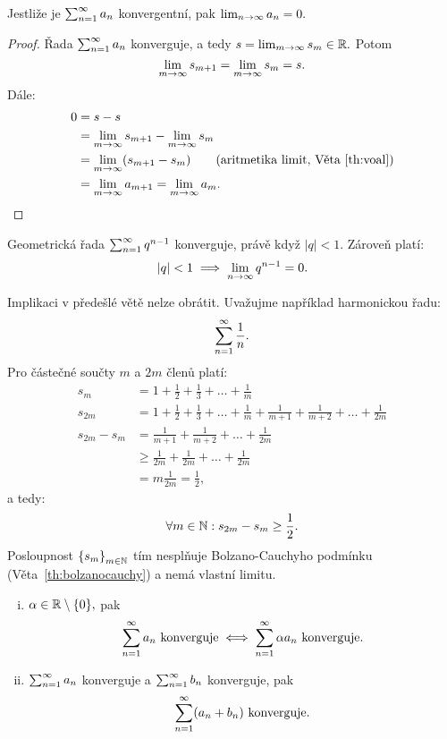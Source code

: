 \begin{theorem}
    \label{th:radykonvergencenutna}
    Jestliže je $\sum_{n=1}^\infty a_n$ konvergentní, pak $\lim_{n \to \infty} a_n = 0.$
\end{theorem}

\begin{proof}
    Řada $\sum_{n=1}^\infty a_n$ konverguje, a tedy $s = \lim_{m\to\infty} s_m \in \mathbb{R}.$ Potom
    $$\lim_{m \to \infty} s_{m+1} = \lim_{m \to \infty} s_m = s.$$
    Dále:
    \begin{align*}
        0 
        &= s-s \\
        &= \limminf s_{m+1} - \limminf s_m \\
        &= \limminf (s_{m+1} - s_m) \tag{aritmetika limit, Věta~\ref{th:voal}}  \\
        &= \limminf a_{m+1} = \limminf a_m.
    \end{align*}
\end{proof}

\begin{example}
    Geometrická řada $\sum_{n=1}^\infty q^{n-1}$ konverguje, právě když $|q| < 1.$ Zároveň
    platí:
    $$|q| < 1 \implies \lim_{n \to \infty} q^{n-1} = 0.$$
\end{example}

\begin{remark}
    \label{rm:konvergence_harmonicke_rady}
    Implikaci v předešlé větě nelze obrátit. Uvažujme například harmonickou
    řadu: 
    $$\sum_{n=1}^\infty \frac{1}{n}.$$
    Pro částečné součty $m$ a $2m$ členů platí:
    \begin{align*}
        s_m &=1 + \frac{1}{2} + \frac{1}{3} + \dots + \frac{1}{m} \\
        s_{2m} &= 1 + \frac{1}{2} + \frac{1}{3} + \dots + \frac{1}{m} + \frac{1}{m+1} + \frac{1}{m+2} + \dots + \frac{1}{2m} \\
        s_{2m} - s_m &= \frac{1}{m+1} + \frac{1}{m+2} + \dots + \frac{1}{2m} \\
                     &\geq \frac{1}{2m} + \frac{1}{2m} + \dots + \frac{1}{2m} \\
                     &= m \frac{1}{2m} = \frac{1}{2},
    \end{align*}
    a tedy:
    $$\forall m \in \mathbb{N}: s_{2m}-s_m \geq \frac{1}{2}.$$
    Posloupnost $\left\{s_m\right\}_{m\in\mathbb{N}}$ tím nesplňuje Bolzano-Cauchyho
    podmínku (Věta~\ref{th:bolzanocauchy}) a nemá vlastní limitu.
\end{remark}

\begin{theorem}
    \label{th:linearitakonvrad}
    \leavevmode
    \begin{enumerate}[(i)]
        \item \Necht $\alpha \in \mathbb{R} \setminus \{0\},$ pak
            $$\sum_{n=1}^\infty a_n \text{ konverguje} \iff \sum_{n=1}^\infty \alpha a_n \text{ konverguje.}$$

        \item \Necht $\sum_{n=1}^\infty a_n$ konverguje a $\sum_{n=1}^\infty b_n$ konverguje,
            pak $$\sum_{n=1}^\infty (a_n + b_n) \text{ konverguje.}$$
    \end{enumerate}
\end{theorem}

